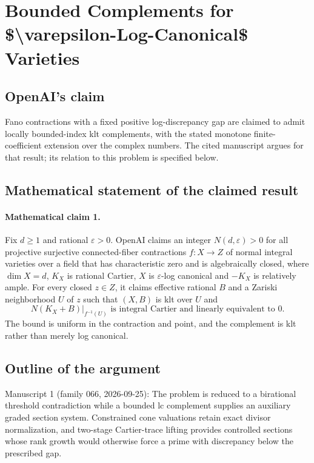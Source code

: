 \documentclass[11pt]{article}
\begin{document}
\section*{Bounded Complements for \$\textbackslash{}varepsilon-Log-Canonical\$ Varieties}

\subsection{OpenAI's claim}
Fano contractions with a fixed positive log-discrepancy gap are claimed to admit locally bounded-index klt complements, with the stated monotone finite-coefficient extension over the complex numbers. The cited manuscript argues for that result; its relation to this problem is specified below.

\subsection{Mathematical statement of the claimed result}
\paragraph{Mathematical claim 1.} Fix $d\ge1$ and rational $\varepsilon>0$. OpenAI claims an integer $N(d,\varepsilon)>0$ for all projective surjective connected-fiber contractions $f:X\to Z$ of normal integral varieties over a field that has characteristic zero and is algebraically closed, where $\dim X=d$, $K_X$ is rational Cartier, $X$ is $\varepsilon$-log canonical and $-K_X$ is relatively ample. For every closed $z\in Z$, it claims effective rational $B$ and a Zariski neighborhood $U$ of $z$ such that $(X,B)$ is klt over $U$ and
\[
N(K_X+B)|_{f^{-1}(U)}\text{ is integral Cartier and linearly equivalent to }0.
\]
The bound is uniform in the contraction and point, and the complement is klt rather than merely log canonical.

\subsection{Outline of the argument}
Manuscript 1 (family 066, 2026-09-25): The problem is reduced to a birational threshold contradiction while a bounded lc complement supplies an auxiliary graded section system. Constrained cone valuations retain exact divisor normalization, and two-stage Cartier-trace lifting provides controlled sections whose rank growth would otherwise force a prime with discrepancy below the prescribed gap.
\end{document}
